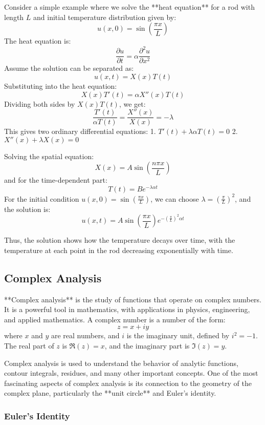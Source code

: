 \documentclass{article}
\begin{document}
Consider a simple example where we solve the **heat equation** for a rod with length \( L \) and initial temperature distribution given by:
\[
u(x, 0) = \sin\left( \frac{\pi x}{L} \right)
\]
The heat equation is:
\[
\frac{\partial u}{\partial t} = \alpha \frac{\partial^2 u}{\partial x^2}
\]
Assume the solution can be separated as:
\[
u(x, t) = X(x)T(t)
\]
Substituting into the heat equation:
\[
X(x)T'(t) = \alpha X''(x)T(t)
\]
Dividing both sides by \( X(x)T(t) \), we get:
\[
\frac{T'(t)}{\alpha T(t)} = \frac{X''(x)}{X(x)} = -\lambda
\]
This gives two ordinary differential equations:
1. \( T'(t) + \lambda \alpha T(t) = 0 \)
2. \( X''(x) + \lambda X(x) = 0 \)

Solving the spatial equation:
\[
X(x) = A \sin\left( \frac{n\pi x}{L} \right)
\]
and for the time-dependent part:
\[
T(t) = B e^{-\lambda \alpha t}
\]
For the initial condition \( u(x, 0) = \sin\left( \frac{\pi x}{L} \right) \), we can choose \( \lambda = \left( \frac{\pi}{L} \right)^2 \), and the solution is:
\[
u(x, t) = A \sin\left( \frac{\pi x}{L} \right) e^{-\left( \frac{\pi}{L} \right)^2 \alpha t}
\]

Thus, the solution shows how the temperature decays over time, with the temperature at each point in the rod decreasing exponentially with time.

\subsection{Complex Analysis}

**Complex analysis** is the study of functions that operate on complex numbers. It is a powerful tool in mathematics, with applications in physics, engineering, and applied mathematics. A complex number is a number of the form:
\[
z = x + iy
\]
where \( x \) and \( y \) are real numbers, and \( i \) is the imaginary unit, defined by \( i^2 = -1 \). The real part of \( z \) is \( \Re(z) = x \), and the imaginary part is \( \Im(z) = y \).

Complex analysis is used to understand the behavior of analytic functions, contour integrals, residues, and many other important concepts. One of the most fascinating aspects of complex analysis is its connection to the geometry of the complex plane, particularly the **unit circle** and Euler's identity.

\subsubsection*{Euler's Identity}
\end{document}
